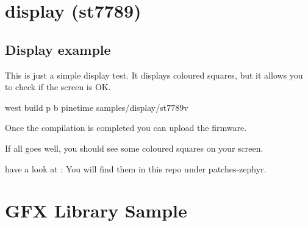 \documentclass[letterpaper,10pt,english]{sphinxmanual}
\begin{document}
\chapter{display (st7789)}
\label{\detokenize{display:display-st7789}}\label{\detokenize{display:display-sample}}\label{\detokenize{display::doc}}

\section{Display    example}
\label{\detokenize{display:display-example}}
This is just a simple display test.
It displays coloured squares, but it allows you to check if the screen is OK.


\begin{sphinxVerbatim}[commandchars=\\\{\}]
       

         
      
\end{sphinxVerbatim}

\begin{sphinxVerbatim}[commandchars=\\\{\}]
  west build \PYGZhy{}p \PYGZhy{}b pinetime samples/display/st7789v
\end{sphinxVerbatim}

Once the compilation is completed you can upload the firmware.

If all goes well, you should see some coloured squares on your screen.


have a look at : 
You will find them in this repo under patches-zephyr.


\chapter{GFX Library Sample}
\label{\detokenize{gfx:gfx-library-sample}}\label{\detokenize{gfx:gfx-sample}}\label{\detokenize{gfx::doc}}
\end{document}
